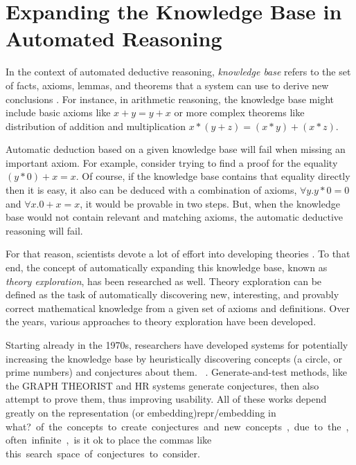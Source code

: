 
\section{Expanding the Knowledge Base in Automated Reasoning}

In the context of automated deductive reasoning, \emph{knowledge base} refers to the set of facts, axioms, lemmas, and theorems that a system can use to derive new conclusions \cite{amlenat1977automated, thesy}.
For instance, in arithmetic reasoning, the knowledge base might include basic axioms like $x + y = y + x$ or more complex theorems like distribution of addition and multiplication $x * (y + z) = (x * y) + (x * z)$.

Automatic deduction based on a given knowledge base will fail when missing an important axiom.
For example, consider trying to find a proof for the equality $(y * 0) + x = x$.
Of course, if the knowledge base contains that equality directly then it is easy, it also can be deduced with a combination of axioms, $\forall y. y * 0 = 0$ and $\forall x. 0 + x = x$, it would be provable in two steps.
But, when the knowledge base would not contain relevant and matching axioms, the automatic deductive reasoning will fail.

For that reason, scientists devote a lot of effort into developing theories \cite{qedatlarge}.
To that end, the concept of automatically expanding this knowledge base, known as \emph{theory exploration}, has been researched as well.
Theory exploration can be defined as the task of automatically discovering new, interesting, and provably correct mathematical knowledge from a given set of axioms and definitions.
Over the years, various approaches to theory exploration have been developed.

Starting already in the 1970s, researchers have developed systems for potentially increasing the knowledge base by heuristically discovering concepts (\eg a circle, or prime numbers) and conjectures about them. ~\cite{amlenat1977automated,buchanan1981dendral}.
Generate-and-test methods, like the GRAPH THEORIST and HR systems \cite{epstein1988graphtheist,colton1999automatichr} generate conjectures, then also attempt to prove them, thus improving usability.
All of these works depend greatly on the representation (or embedding)\SI{repr/embedding in what?} of the concepts to create conjectures and new concepts, due to the, often infinite,\SI{is it ok to place the commas like this} search space of conjectures to consider.

